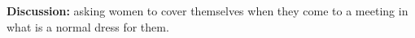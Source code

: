 \begin{exam}{\autoExamName}
\begin{problem*}
\begin{parts}
  \bigskip

  \textbf{Discussion:} asking women to cover themselves when they come to a
  meeting in what is a normal dress for them.

  \bigskip

\end{parts}

\end{problem*}

\end{exam}
